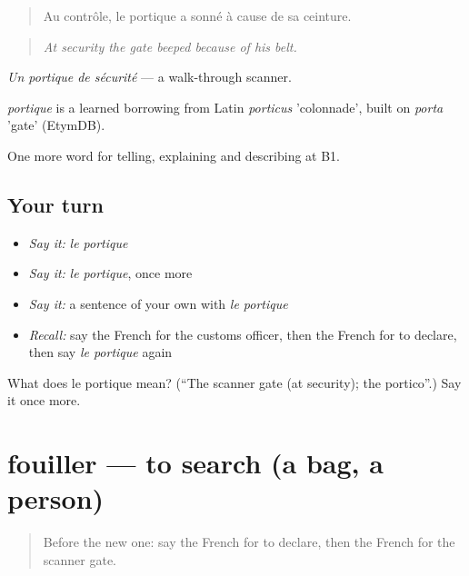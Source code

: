 \begin{quote}
Au contrôle, le portique a sonné à cause de sa ceinture.
\end{quote}

\begin{quote}
\emph{At security the gate beeped because of his belt.}
\end{quote}

\emph{Un portique de sécurité} — a walk-through scanner.

\begin{cousinweb}
\emph{portique} is a learned borrowing from Latin \emph{porticus} 'colonnade', built on \emph{porta} 'gate' (EtymDB).
\end{cousinweb}

\begin{grammarlens}[title={What you've built}]
One more word for telling, explaining and describing at B1.
\end{grammarlens}

\subsection*{Your turn}
\begin{itemize}
\raggedright
  \item \emph{Say it:} \emph{le portique}
  \item \emph{Say it:} \emph{le portique}, once more
  \item \emph{Say it:} a sentence of your own with \emph{le portique}
  \item \emph{Recall:} say the French for the customs officer, then the French for to declare, then say \emph{le portique} again
\end{itemize}

\begin{tcolorbox}[breakable,colback=teal!4,colframe=teal!35!black,title={Before you move on}]
What does le portique mean? (\textquotedblleft{}The scanner gate (at security); the portico\textquotedblright{}.) Say it once more.
\end{tcolorbox}
\section[fouiller]{fouiller — to search (a bag, a person)}

\label{lesson:FR-C417-fouiller}



\begin{quote}
Before the new one: say the French for to declare, then the French for the scanner gate.
\end{quote}


